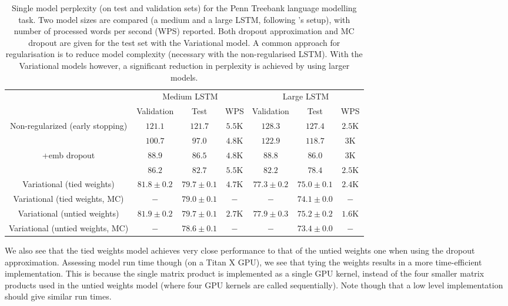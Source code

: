 \documentclass{article}
\theoremstyle{definition}
\begin{document}
\begin{table}[t!]
\center
\def\arraystretch{1.2}\hspace*{-3mm}
\tabcolsep=0.14cm
\begin{tabular}{c|ccc|ccc}
 & \multicolumn{3}{c}{\small Medium LSTM} & \multicolumn{3}{c}{\small Large LSTM} \\ 
 & Validation & Test & WPS & Validation & Test & WPS \\ 
\hline 
Non-regularized (early stopping) & 
$121.1$ & $121.7$ & $5.5$K & $128.3$ & $127.4$ & $2.5$K \\  
\citet{moon2015rnndrop} & $100.7$ & $97.0$ & $4.8$K & $122.9$ & $118.7$ & $3$K \\  
\citet{moon2015rnndrop} +emb dropout & $88.9$ & $86.5$ & $4.8$K & $88.8$ & $86.0$ & $3$K \\  
\citet{zaremba2014recurrent} & $86.2$ & $82.7$ & $5.5$K & $82.2$ & $78.4$ & $2.5$K \\  
\hline 
Variational (tied weights) & $81.8 \pm 0.2$ & $79.7 \pm 0.1$ & $4.7$K & $77.3 \pm 0.2$ & $75.0 \pm 0.1$ & $2.4$K \\  
Variational (tied weights, MC) & $-$ & $79.0 \pm 0.1$ & $-$ & $-$ & $74.1 \pm 0.0$ & $-$ \\  
Variational (untied weights) & $81.9 \pm 0.2$ & $79.7 \pm 0.1$ & $2.7$K & $77.9 \pm 0.3$ & $75.2 \pm 0.2$ & $1.6$K \\ 
Variational (untied weights, MC) & $-$ & $\mathbf{78.6 \pm 0.1}$ & $-$ & $-$ & $\mathbf{73.4 \pm 0.0}$ & $-$ \\  
\hline
\end{tabular}
\vspace{2mm}
\caption{Single model perplexity (on test and validation sets) for the Penn Treebank language modelling task. Two model sizes are compared (a medium and a large LSTM, following \citep{zaremba2014recurrent}'s setup), with number of processed words per second (WPS) reported. 
Both dropout approximation and MC dropout are given for the test set with the Variational model.
A common approach for regularisation 
is to reduce model complexity (necessary with the non-regularised LSTM).
With the Variational models however, a significant reduction in perplexity is achieved by using larger models. 
}
\label{table:LM}
\vspace{-9mm}
\end{table}





We also see that the tied weights model achieves very close performance to that of the untied weights one when using the dropout approximation. Assessing model run time though (on a Titan X GPU), we see that tying the weights results in a more time-efficient implementation. This is because the single matrix product is implemented as a single GPU kernel, instead of the four smaller matrix products used in the untied weights model (where four GPU kernels are called sequentially). Note though that a low level implementation should give similar run times.
\end{document}
